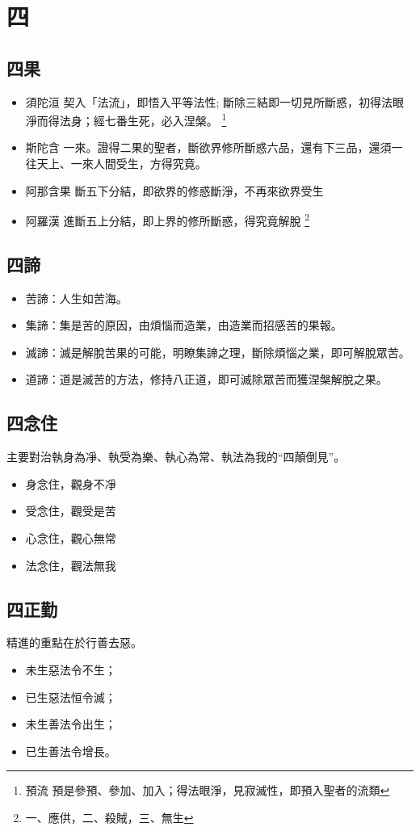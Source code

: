 \section{四}

\subsection{四果}
\begin{itemize}
  \item 須陀洹 契入「法流」，即悟入平等法性; 斷除三結即一切見所斷惑，初得法眼淨而得法身；經七番生死，必入涅槃。
    \footnote{預流 預是參預、參加、加入；得法眼淨，見寂滅性，即預入聖者的流類}
  \item 斯陀含 一來。證得二果的聖者，斷欲界修所斷惑六品，還有下三品，還須一往天上、一來人間受生，方得究竟。
  \item 阿那含果 斷五下分結，即欲界的修惑斷淨，不再來欲界受生
  \item 阿羅漢 進斷五上分結，即上界的修所斷惑，得究竟解脫
    \footnote{一、應供，二、殺賊，三、無生}
\end{itemize}

\subsection{四諦}
\begin{itemize}
  \item 苦諦：人生如苦海。
  \item 集諦：集是苦的原因，由煩惱而造業，由造業而招感苦的果報。
  \item 滅諦：滅是解脫苦果的可能，明瞭集諦之理，斷除煩惱之業，即可解脫眾苦。
  \item 道諦：道是滅苦的方法，修持八正道，即可滅除眾苦而獲涅槃解脫之果。
\end{itemize}

\subsection{四念住}
主要對治執身為凈、執受為樂、執心為常、執法為我的“四顛倒見”。
\begin{itemize}
  \item 身念住，觀身不凈
  \item 受念住，觀受是苦
  \item 心念住，觀心無常
  \item 法念住，觀法無我
\end{itemize}

\subsection{四正勤}
精進的重點在於行善去惡。
\begin{itemize}
  \item 未生惡法令不生；
  \item 已生惡法恒令滅；
  \item 未生善法令出生；
  \item 已生善法令增長。
\end{itemize}


